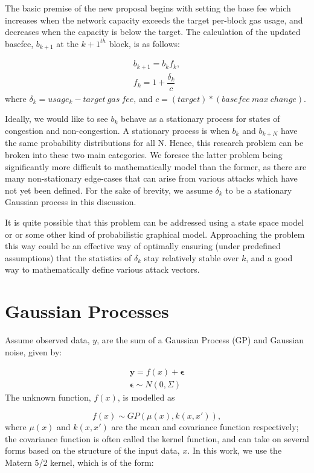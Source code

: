 \documentclass[peerreview]{ieeesyscoin}
\begin{document}
The basic premise of the new proposal begins with setting the base fee which increases when the network capacity exceeds the target per-block gas usage, and decreases when the capacity is below the target. The calculation of the updated basefee, $b_{k+1}$ at the $k+1^{th}$ block,  is as follows:

\begin{eqnarray} \label{eq:eip1559}
b_{k+1} = b_{k} f_{k}, \\
f_{k} = 1 + \dfrac{\delta_{k}}{c}
\end{eqnarray}
where $\delta_{k} = usage_{k} - target~gas~fee$, and $c = (target)*(basefee~max~change)$.

Ideally, we would like to see $b_{k}$ behave as a stationary process for states of congestion and non-congestion. A stationary process is when $b_{k}$ and $b_{k+N}$ have the same probability distributions for all N. Hence, this research problem can be broken into these two main categories. We foresee the latter problem being significantly more difficult to mathematically model than the former, as there are many non-stationary edge-cases that can arise from various attacks which have not yet been defined. For the sake of brevity, we assume $\delta_{k}$ to be a stationary Gaussian process in this discussion.

It is quite possible that this problem can be addressed using a state space model or or some other kind of probabilistic graphical model. Approaching the problem this way could be an effective way of optimally ensuring (under predefined assumptions) that the statistics of $\delta_{k}$ stay relatively stable over $k$, and a good way to mathematically define various attack vectors.

\section{Gaussian Processes}
\label{appendix:marginal}

Assume observed data, $y$, are the sum of a Gaussian Process (GP) and Gaussian noise, given by:

\begin{eqnarray}
\mathbf{y} = f(x) + \mathbf{\epsilon}  \\
\mathbf{\epsilon}  \sim N(0,\Sigma) 
\end{eqnarray}
The unknown function, $f(x)$, is modelled as

\begin{equation}
f(x) \sim GP(\mu(x), k(x,x')),
\end{equation}
where $\mu(x)$ and $k(x,x')$ are the mean and covariance function respectively; the covariance function is often called the kernel function, and can take on several forms based on the structure of the input data, $x$. In this work, we use the Matern 5/2 kernel, which is of the form:
\end{document}
